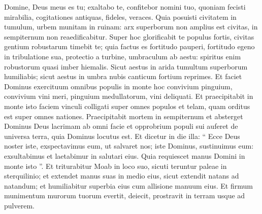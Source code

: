 \begin{biblechapter}
\begin{biblechapter}
\begin{biblechapter}
\begin{biblechapter}
\begin{biblechapter}
\begin{biblechapter}
\begin{biblechapter}
\begin{biblechapter}
\begin{biblechapter}
\begin{biblechapter}
\begin{biblechapter}
\begin{biblechapter}
\begin{biblechapter}
\begin{biblechapter}
\begin{biblechapter}
\begin{biblechapter}
\begin{biblechapter}
\begin{biblechapter}
\begin{biblechapter}
\begin{biblechapter}
\begin{biblechapter}
\begin{biblechapter}
\begin{biblechapter}
\begin{biblechapter}
\begin{biblechapter}
\verse Domine, Deus meus es tu;
 exaltabo te, confitebor nomini tuo,
 quoniam fecisti mirabilia,
 cogitationes antiquas, fideles, veraces.
 \verse Quia posuisti civitatem in tumulum,
 urbem munitam in ruinam:
 arx superborum non amplius est civitas,
 in sempiternum non reaedificabitur.
 \verse Super hoc glorificabit te populus fortis,
 civitas gentium robustarum timebit te;
 \verse quia factus es fortitudo pauperi,
 fortitudo egeno in tribulatione sua,
 protectio a turbine,
 umbraculum ab aestu:
 spiritus enim robustorum
 quasi imber hiemalis.
 \verse Sicut aestus in arida
 tumultum superborum humiliabis; sicut aestus in umbra nubis
 canticum fortium reprimes.
 \verse Et faciet Dominus exercituum
 omnibus populis in monte hoc
 convivium pinguium,
 convivium vini meri,
 pinguium medullatorum,
 vini deliquati.
 \verse Et praecipitabit in monte isto
 faciem vinculi colligati super omnes populos
 et telam, quam orditus est super omnes nationes.
 \verse Praecipitabit mortem in sempiternum
 et absterget Dominus Deus lacrimam ab omni facie
 et opprobrium populi sui auferet de universa terra,
 quia Dominus locutus est.
 \verse Et dicetur in die illa: “ Ecce Deus noster iste,
 exspectavimus eum, ut salvaret nos;
 iste Dominus, sustinuimus eum:
 exsultabimus et laetabimur in salutari eius.
 \verse Quia requiescet manus Domini in monte isto ”.
 Et triturabitur Moab in loco suo,
 sicuti teruntur paleae in sterquilinio;
 \verse et extendet manus suas in medio eius,
 sicut extendit natans ad natandum;
 et humiliabitur superbia eius
 cum allisione manuum eius.
 \verse Et firmum munimentum murorum tuorum evertit,
 deiecit, prostravit in terram usque ad pulverem.
 

\end{biblechapter}
\end{biblechapter}
\end{biblechapter}
\end{biblechapter}
\end{biblechapter}
\end{biblechapter}
\end{biblechapter}
\end{biblechapter}
\end{biblechapter}
\end{biblechapter}
\end{biblechapter}
\end{biblechapter}
\end{biblechapter}
\end{biblechapter}
\end{biblechapter}
\end{biblechapter}
\end{biblechapter}
\end{biblechapter}
\end{biblechapter}
\end{biblechapter}
\end{biblechapter}
\end{biblechapter}
\end{biblechapter}
\end{biblechapter}
\end{biblechapter}
